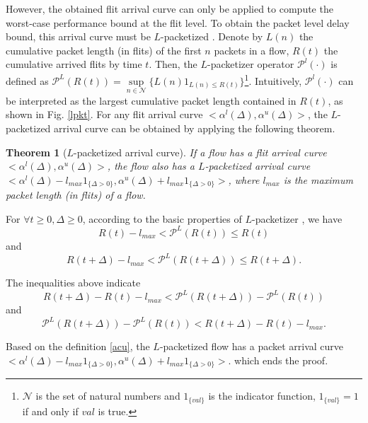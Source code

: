 \documentclass[preprint]{elsarticle}
\newtheorem{thm}{Theorem}
\begin{document}
However, the obtained flit arrival curve can only be applied to compute the worst-case performance bound at the flit level. To obtain the packet level delay bound, this arrival curve must be $L$-packetized \cite{Boudec2001Network}. Denote by $L(n)$ the cumulative packet length (in flits) of the first $n$ packets in a flow, $R(t)$ the cumulative arrived flits by time $t$. Then, the $L$-packetizer operator $\mathcal{P}^l(\cdot)$ is defined as $\mathcal{P}^L(R(t))=\underset{n\in\mathcal{N}}{\sup}\{L(n)1_{L(n)\leq R(t)}\}$\footnote{$\mathcal{N}$ is the set of natural numbers and $1_{\{val\}}$ is the indicator function, $1_{\{val\}}=1$ if and only if $val$ is true.}. Intuitively, $\mathcal{P}^l(\cdot)$ can be interpreted as the largest cumulative packet length contained in $R(t)$, as shown in Fig. \ref{lpkt}. For any flit arrival curve $<\alpha^l(\Delta),\alpha^u(\Delta)>$, the $L$-packetized arrival curve can be obtained by applying the following theorem.
\begin{thm}[$L$-packetized arrival curve]\label{pktac}
If a flow has a flit arrival curve $<\alpha^l(\Delta),\alpha^u(\Delta)>$, the flow also has a $L$-packetized arrival curve $<\alpha^l(\Delta)-l_{max}1_{\{\Delta>0\}},\alpha^u(\Delta)+l_{max}1_{\{\Delta>0\}}>$, where $l_{max}$ is the maximum packet length (in flits) of a flow.
\end{thm}
\begin{pf}
For $\forall t\geq 0,\Delta\geq 0$, according to the basic properties of $L$-packetizer \cite{Boudec2001Network}, we have
$$R(t)-l_{max}< \mathcal{P}^L(R(t))\leq R(t)$$
and
$$R(t+\Delta)-l_{max}< \mathcal{P}^L(R(t+\Delta))\leq R(t+\Delta).$$

The inequalities above indicate
$$R(t+\Delta)-R(t)-l_{max}< \mathcal{P}^L(R(t+\Delta))-\mathcal{P}^L(R(t))$$
and
$$\mathcal{P}^L(R(t+\Delta))-\mathcal{P}^L(R(t))< R(t+\Delta)-R(t)-l_{max}.$$

Based on the definition \ref{acu}, the $L$-packetized flow has a packet arrival curve $<\alpha^l(\Delta)-l_{max}1_{\{\Delta>0\}},\alpha^u(\Delta)+l_{max}1_{\{\Delta>0\}}>$.
which ends the proof.
\end{pf}
\end{document}
